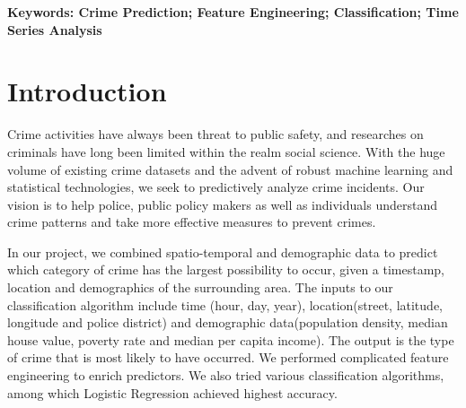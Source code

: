 \documentclass[11pt,conference]{IEEEtran}
\begin{document}
\begin{abstract}
In this paper, we apply machine learning and time series analysis to the problem of classifying and forecasting crime incidents in San Francisco. Our dataset originates from a Kaggle competition \cite{1}. Based on existing researches on these problems, we employ Logistic Regression and VAR(p) models respectively. The classification problem result demonstrates high challenge as our results across all the 39 crime categories achieved the accuracy of 32.67\%. For the time series analysis, we revealed correlations of occurrences of difference crime categories. And the VAR(p) model can forecast the trend of number of certain crimes. We also involved demographic data for classification problem, which contributed to a slight improvement to accuracy. With richer and more up-to-date data, our results might be further improved.
\end{abstract}

{\bf Keywords: Crime Prediction; Feature Engineering; Classification; Time Series Analysis}


%
\IEEEpeerreviewmaketitle


\section{Introduction}
Crime activities have always been threat to public safety, and researches on criminals have long been limited within the realm social science. With the huge volume of existing crime datasets and the advent of robust machine learning and statistical technologies, we seek to predictively analyze crime incidents. Our vision is to help police, public policy makers as well as individuals understand crime patterns and take more effective measures to prevent crimes.

In our project, we combined spatio-temporal and demographic data to predict which category of crime has the largest possibility to occur, given a timestamp, location and demographics of the surrounding area. The inputs to our classification algorithm include time (hour, day, year), location(street, latitude, longitude and police district) and demographic data(population density, median house value, poverty rate and median per capita income). The output is the type of crime that  is most likely to have occurred. We performed complicated feature engineering to enrich predictors. We also tried various classification algorithms, among which Logistic Regression achieved highest accuracy.
\end{document}
